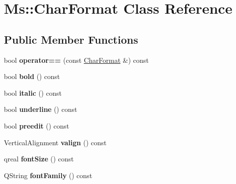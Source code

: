 \hypertarget{class_ms_1_1_char_format}{}\section{Ms\+:\+:Char\+Format Class Reference}
\label{class_ms_1_1_char_format}
\subsection*{Public Member Functions}
\begin{DoxyCompactItemize}
\item 
\mbox{\label{class_ms_1_1_char_format_a6893dec5a11f900d332119d85a2540f5}} 
bool {\bfseries operator==} (const \hyperlink{class_ms_1_1_char_format}{Char\+Format} \&) const
\item 
\mbox{\label{class_ms_1_1_char_format_abc125b08cfdd4b066eb4aeba15d654c8}} 
bool {\bfseries bold} () const
\item 
\mbox{\label{class_ms_1_1_char_format_a2db1df582f26c36da68d16a7086e59b5}} 
bool {\bfseries italic} () const
\item 
\mbox{\label{class_ms_1_1_char_format_aa94e17055b19483736434fb97d880434}} 
bool {\bfseries underline} () const
\item 
\mbox{\label{class_ms_1_1_char_format_a13ef2d95d624fd807739b4b67b913274}} 
bool {\bfseries preedit} () const
\item 
\mbox{\label{class_ms_1_1_char_format_aa85d584ee00d585fc4ab795afc6ffe35}} 
Vertical\+Alignment {\bfseries valign} () const
\item 
\mbox{\label{class_ms_1_1_char_format_a4e40123dd4265168ecdf51c23955453c}} 
qreal {\bfseries font\+Size} () const
\item 
\mbox{\label{class_ms_1_1_char_format_a0a0e9c2be83b6a22311779b6850de53d}} 
Q\+String {\bfseries font\+Family} () const
\item 
\mbox{\label{class_ms_1_1_char_format_abc38783cfba387e7219df72d7e7a6741}} 

\end{DoxyCompactItemize}
